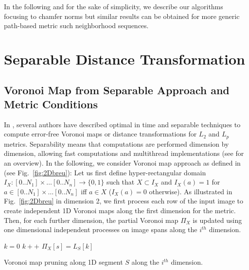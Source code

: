 \documentclass{llncs}
\begin{document}
 In the following and for the sake of simplicity, we describe our
 algorithms focusing to chamfer norms but similar results can be
 obtained for more generic path-based metric such neighborhood
 sequences.

\section{Separable Distance Transformation}
\label{sec:separ-dist-transf}



\subsection{Voronoi Map from Separable Approach and Metric Conditions}
\label{sec:voronoi-map-from}

In \cite{Hirata1996,SaitTori:94,Breu1995,Meijster2000,Maurer2003},
several authors have described optimal in time and separable
techniques to compute error-free Voronoi maps or distance
transformations for $L_2$ and $L_p$ metrics. Separability means that
computations are performed dimension by dimension, allowing fast
computations and multithread implementations (see
\cite{dcoeurjo_ChapDT} for an overview).  In the following, we
consider Voronoi map approach as defined in \cite{Breu1995} (see
Fig.~\ref{fig:2Dbreu}): Let us first define hyper-rectangular domain
$I_X: [0..N_1]\times\ldots[0..N_n] \rightarrow \{0,1\}$ such that
$X\subset I_X$ and $I_X(a)= 1$ for $a\in [0..N_1]\times\ldots[0..N_n]$
iff $a\in X$ ($I_X(a)=0$ otherwise). As illustrated in
Fig.~\ref{fig:2Dbreu} in dimension 2, we first process each row of the
input image to create independent 1D Voronoi maps along the first
dimension for the metric. Then, for each further dimension, the
partial Voronoi map $\Pi_X$ is updated using one dimensional
independent processes on image spans along the $i^{th}$
dimension.

\begin{algorithm}[H]
{ $k=0$\;
}
  {
          {
            $k++$\;
          }
    $\Pi_X[s] = L_S[k]$\;
  }

  \caption{Voronoi map pruning along 1D segment $S$ along the $i^{th}$
    dimension.\label{alg:voro}}
\end{algorithm}
\end{document}
